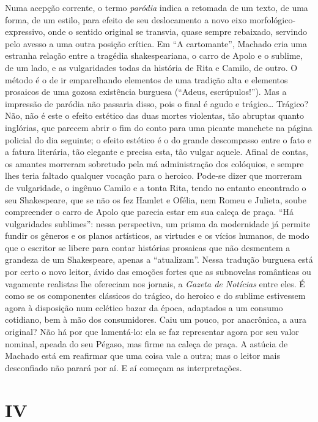 Numa acepção corrente, o termo \emph{paródia} indica a retomada de um
texto, de uma forma, de um estilo, para efeito de seu deslocamento a
novo eixo morfológico-expressivo, onde o sentido original se transvia,
quase sempre rebaixado, servindo pelo avesso a uma outra posição
crítica. Em ``A cartomante'', Machado cria uma estranha relação entre a
tragédia shakespeariana, o carro de Apolo e o sublime, de um lado, e as
vulgaridades todas da história de Rita e Camilo, de outro. O método é o
de ir emparelhando elementos de uma tradição alta e elementos prosaicos
de uma gozosa existência burguesa (``Adeus, escrúpulos!''). Mas a
impressão de paródia não passaria disso, pois o final é agudo e
trágico\ldots{} Trágico? Não, não é este o efeito estético das duas
mortes violentas, tão abruptas quanto inglórias, que parecem abrir o fim
do conto para uma picante manchete na página policial do dia seguinte; o
efeito estético é o do grande descompasso entre o fato e a fatura
literária, tão elegante e precisa esta, tão vulgar aquele. Afinal de
contas, os amantes morreram sobretudo pela má administração dos
colóquios, e sempre lhes teria faltado qualquer vocação para o heroico.
Pode-se dizer que morreram de vulgaridade, o ingênuo Camilo e a tonta
Rita, tendo no entanto encontrado o seu Shakespeare, que se não os fez
Hamlet e Ofélia, nem Romeu e Julieta, soube compreender o carro de Apolo
que parecia estar em sua caleça de praça. ``Há vulgaridades sublimes'':
nessa perspectiva, um prisma da modernidade já permite fundir os gêneros
e os planos artísticos, as virtudes e os vícios humanos, de modo que o
escritor se libere para contar histórias prosaicas que não desmentem a
grandeza de um Shakespeare, apenas a ``atualizam''. Nessa tradução
burguesa está por certo o novo leitor, ávido das emoções fortes que as
subnovelas românticas ou vagamente realistas lhe ofereciam nos jornais,
a \emph{Gazeta de Notícias} entre eles. É como se os componentes
clássicos do trágico, do heroico e do sublime estivessem agora à
disposição num eclético bazar da época, adaptados a um consumo
cotidiano, bem à mão dos consumidores. Caiu um pouco, por anacrônica, a
aura original? Não há por que lamentá-lo: ela se faz representar agora
por seu valor nominal, apeada do seu Pégaso, mas firme na caleça de
praça. A astúcia de Machado está em reafirmar que uma coisa vale a
outra; mas o leitor mais desconfiado não parará por aí. E aí começam as
interpretações.

\section{IV}

